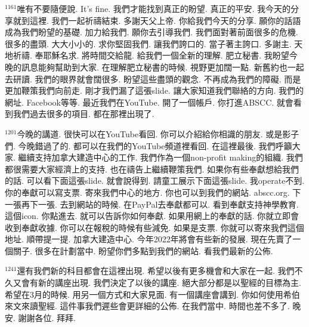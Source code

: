 \documentclass{book}
\begin{document}
$^{1161}$唯有不要隨便說.
It's fine.
我們才能找到真正的盼望.
真正的平安.
我今天的分享就到這裡.
我們一起祈禱結束.
多謝天父上帝.
你給我們今天的分享.
願你的話語成為我們盼望的基礎.
加力給我們.
願你去引導我們.
我們面對著前面很多的危機.
很多的盡頭.
大大小小的.
求你堅固我們.
讓我們誇口的.
當子著主誇口.
多謝主.
天地祈禱.
奉耶穌名求.
將時間交給龍.
給我們一個全新的理解.
肥立秘書.
我盼望今晚的訊息能夠幫助到大家.
在理解肥立秘書的時候.
視野更加闊一點.
新舊約也一起去研讀.
我們的眼界就會闊很多.
盼望這些盡頭的觀念.
不再成為我們的障礙.
而是更加鞭策我們向前走.
剛才我們漏了這張slide.
讓大家知道我們聯絡的方向.
我們的網址.
Facebook等等.
最近我們在YouTube.
開了一個帳戶.
你打進ABSCC.
就會看到我們過去很多的項目.
都在那裡出現了.

$^{1201}$今晚的講道.
很快可以在YouTube看回.
你可以介紹給你相識的朋友.
或是影子們.
今晚錯過了的.
都可以在我們的YouTube頻道裡看回.
在這裡最後.
我們呼籲大家.
繼續支持加拿大建造中心的工作.
我們作為一個non-profit making的組織.
我們都很需要大家經濟上的支持.
也在禱告上繼續鞭策我們.
如果你有些奉獻想給我們的話.
可以看下面這張slide.
就會說得到.
請童工展示下面這張slide.
我operate不到.
你的奉獻可以寫支票.
寄來我們中心的地方.
你也可以到我們的網站.
abscc.org.
下一張再下一張.
去到網站的時候.
在PayPal去奉獻都可以.
看到奉獻支持神學教育.
這個icon.
你點進去.
就可以告訴你如何奉獻.
如果用網上的奉獻的話.
你就立即會收到奉獻收據.
你可以在報稅的時候有些減免.
如果是支票.
你就可以寄來我們這個地址.
順帶提一提.
加拿大建造中心.
今年2022年將會有些新的發展.
現在先賣了一個關子.
很多在計劃當中.
盼望你們多點到我們的網站.
看我們最新的公佈.

$^{1241}$還有我們新的科目都會在這裡出現.
希望以後有更多機會和大家在一起.
我們不久又會有新的講座出現.
我們決定了以後的講座.
絕大部分都是以聖經的目標為主.
希望在3月的時候.
用另一個方式和大家見面.
有一個講座會講到.
你如何使用希伯來文來讀聖經.
這件事我們遲些會更詳細的公佈.
在我們當中.
時間也差不多了.
晚安.
謝謝各位.
拜拜.
\newpage
\end{document}

